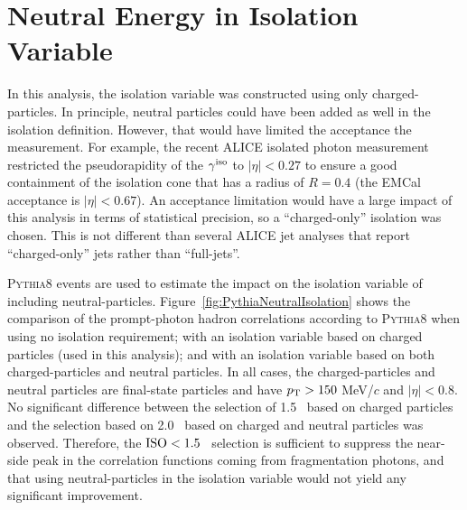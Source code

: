 \FloatBarrier
\section{Neutral Energy in Isolation Variable}

In this analysis, the isolation variable was constructed using only charged-particles. In principle, neutral particles could have been added as well in the isolation definition. However, that would have limited the acceptance the measurement. For example, the recent ALICE isolated photon measurement~\cite{Acharya:2019jkx} restricted the pseudorapidity of the $\gamma^\mathrm{iso}$ to $|\eta|<0.27$ to ensure a good containment of the isolation cone that has a radius of $R=0.4$ (the EMCal acceptance is $|\eta|<0.67$). An acceptance limitation would have a large impact of this analysis in terms of statistical precision, so a ``charged-only'' isolation was chosen. This is not different than several ALICE jet analyses that report ``charged-only'' jets rather than ``full-jets''. 

\textsc{Pythia8} events are used to estimate the impact on the isolation variable of including neutral-particles. Figure~\ref{fig:PythiaNeutralIsolation} shows the comparison of the prompt-photon hadron correlations according to \textsc{Pythia8} when using no isolation requirement; with an isolation variable based on charged particles (used in this analysis); and with an isolation variable based on both charged-particles and neutral particles. In all cases, the charged-particles and neutral particles are final-state particles and have $p_{\mathrm{T}}>150$ MeV/$c$ and $|\eta|<0.8$. No significant difference between the selection of 1.5 \GeVc~based on charged particles and the selection based on 2.0 \GeVc~based on charged and neutral particles was observed. Therefore, the $\mathrm{ISO}<1.5$ \GeVc~selection is sufficient to suppress the near-side peak in the correlation functions coming from fragmentation photons, and that using neutral-particles in the isolation variable would not yield any significant improvement.


